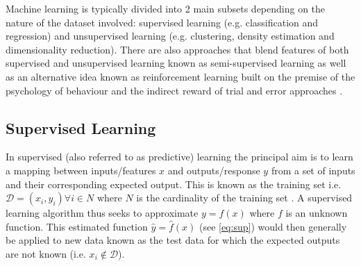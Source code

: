 

Machine learning is typically divided into 2 main subsets depending on the nature of the dataset involved: 
supervised learning (e.g. classification and regression) and unsupervised learning (e.g. clustering,
density estimation and dimensionality reduction).
There are also approaches that blend features of both supervised and unsupervised learning known as semi-supervised
learning as well as an alternative idea known as reinforcement learning built on the premise of the psychology
of behaviour and the indirect reward of trial and error approaches \citep{Bishop2006}.

\subsection{Supervised Learning}

In supervised (also referred to as predictive) learning the principal aim is 
to learn a mapping between inputs/features \(x\) and outputs/response \(y\) from a set of 
inputs and their corresponding expected output.  This is known as the training set 
i.e. \(\mathcal{D} = {(x_{i}, y_{i}) \forall i \in N}\) where \(N\) is 
the cardinality of the training set \citep{Murphy2012}.  
A supervised learning algorithm thus seeks to approximate \(y=f(x)\) where \(f\) is an unknown 
function. This estimated function \(\hat{y} = \hat{f}(x)\) (see \ref{eq:sup}) would then generally
be applied to new data known as the test data for which the expected outputs are not known (i.e. 
\(x_{i} \not \in \mathcal{D}\)).

